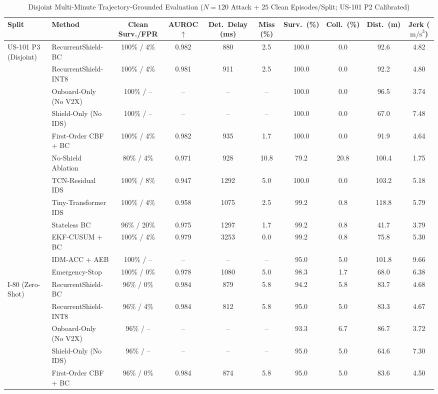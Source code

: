 \begin{table}[t]
\centering
\caption{Disjoint Multi-Minute Trajectory-Grounded Evaluation ($N=120$ Attack + $25$ Clean Episodes/Split; US-101 P2 Calibrated)}
\label{tab:benchmark_results}
\scriptsize
\setlength{\tabcolsep}{2.8pt}
\begin{tabular}{llcccccccc}
\toprule
Split & Method & Clean Surv./FPR & AUROC $\uparrow$ & Det.\ Delay (ms) & Miss (\%) & Surv.\ (\%) & Coll.\ (\%) & Dist.\ (m) & Jerk ($\text{m/s}^3$) \\
\midrule
US-101 P3 (Disjoint) & RecurrentShield-BC & 100\% / 4\% & 0.982 & 880 & 2.5 & 100.0 & 0.0 & 92.6 & 4.82 \\
 & RecurrentShield-INT8 & 100\% / 4\% & 0.981 & 911 & 2.5 & 100.0 & 0.0 & 92.2 & 4.80 \\
 & Onboard-Only (No V2X) & 100\% / -- & -- & -- & -- & 100.0 & 0.0 & 96.5 & 3.74 \\
 & Shield-Only (No IDS) & 100\% / -- & -- & -- & -- & 100.0 & 0.0 & 67.0 & 7.48 \\
 & First-Order CBF + BC & 100\% / 4\% & 0.982 & 935 & 1.7 & 100.0 & 0.0 & 91.9 & 4.64 \\
 & No-Shield Ablation & 80\% / 4\% & 0.971 & 928 & 10.8 & 79.2 & 20.8 & 100.4 & 1.75 \\
 & TCN-Residual IDS & 100\% / 8\% & 0.947 & 1292 & 5.0 & 100.0 & 0.0 & 103.2 & 5.18 \\
 & Tiny-Transformer IDS & 100\% / 4\% & 0.958 & 1075 & 2.5 & 99.2 & 0.8 & 118.8 & 5.79 \\
 & Stateless BC & 96\% / 20\% & 0.975 & 1297 & 1.7 & 99.2 & 0.8 & 41.7 & 3.79 \\
 & EKF-CUSUM + BC & 100\% / 4\% & 0.979 & 3253 & 0.0 & 99.2 & 0.8 & 75.8 & 5.30 \\
 & IDM-ACC + AEB & 100\% / -- & -- & -- & -- & 95.0 & 5.0 & 101.8 & 9.66 \\
 & Emergency-Stop & 100\% / 0\% & 0.978 & 1080 & 5.0 & 98.3 & 1.7 & 68.0 & 6.38 \\
\midrule
I-80 (Zero-Shot) & RecurrentShield-BC & 96\% / 0\% & 0.984 & 879 & 5.8 & 94.2 & 5.8 & 83.7 & 4.68 \\
 & RecurrentShield-INT8 & 96\% / 4\% & 0.984 & 812 & 5.8 & 95.0 & 5.0 & 83.3 & 4.67 \\
 & Onboard-Only (No V2X) & 96\% / -- & -- & -- & -- & 93.3 & 6.7 & 86.7 & 3.72 \\
 & Shield-Only (No IDS) & 96\% / -- & -- & -- & -- & 95.0 & 5.0 & 64.6 & 7.30 \\
 & First-Order CBF + BC & 96\% / 0\% & 0.984 & 874 & 5.8 & 95.0 & 5.0 & 83.6 & 4.50 \\

\end{tabular}
\end{table}
